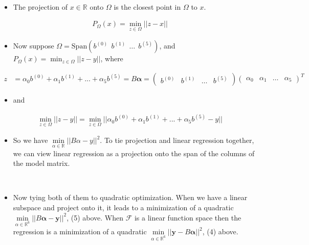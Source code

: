 \documentclass[]{article}
\begin{document}
~

\begin{itemize} \item[ ] 
The projection of $x \in \mathbb{R}$ onto $\Omega$ is the closest point in $\Omega$ to $x$.
\end{itemize}

\begin{align*}
    P_\Omega(x) = \min_{z \in \Omega} ||z-x||
\end{align*}

\begin{itemize} \item[ ] 
Now suppose $\Omega =  \text{Span}\left(b^{(0)} \ \ b^{(1)} \ \ \dots \ \ b^{(5)}\right)$, and \(\displaystyle P_\Omega(x) = \min_{z \in \Omega} ||z-y|| \), where 
\end{itemize}

\begin{align*}
     z &= \alpha_0 b^{(0)} + \alpha_1 b^{(1)} + ... + \alpha_5 b^{(5)} = B{\bm \alpha} = 
        \begin{pmatrix}
         b^{(0)} &  b^{(1)}& \dots & b^{(5)}
        \end{pmatrix}
        \begin{pmatrix}
        \alpha_0 & \alpha_1 & \dots & \alpha_5
        \end{pmatrix}^T
\end{align*}\begin{itemize} \item[ ] 
and 
\end{itemize}\begin{align} \min_{z \in \Omega} ||z-y|| = \min_{z \in \Omega} ||\alpha_0 b^{(0)} + \alpha_1 b^{(1)} + ... + \alpha_5 b^{(5)}-y|| \end{align}

\begin{itemize} \item[ ] 
So we have $\min\limits_{\alpha \in \mathbb{R}} ||B \alpha - y||^2$. To tie projection and linear regression together, we can view linear regression as a projection onto the span of the columns of the model matrix. 
\end{itemize}

~

\begin{itemize} \item[ ] 
Now tying both of them to quadratic optimization. When we have a linear subspace and project onto it, it leads to a minimization of a quadratic $\min\limits_{\alpha \in \mathbb{R}^6} ||B{\bm \alpha}-{\bm y}||^2$, (5) above. When $\mathcal{F}$ is a linear function space then the regression is a minimization of a quadratic $\min\limits_{\alpha \in \mathbb{R}^6 } ||{\bm y}-B{\bm \alpha}||^2$, (4) above.
\end{itemize}
\end{document}
